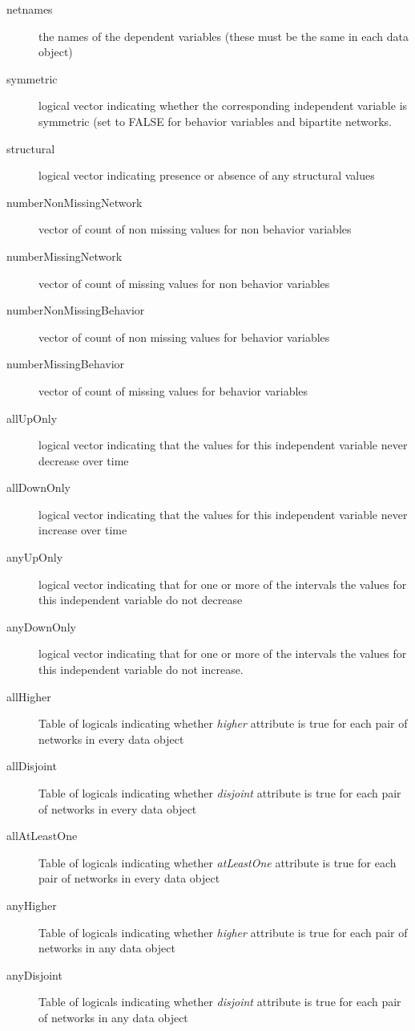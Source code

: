\documentclass[12pt,a4paper]{article}
\renewcommand{\=}{\,=\,}
\newcommand{\+}{\,+\,}
\begin{document}
\begin{description}
\item[netnames] the names of the dependent variables (these must be the same in
  each data object)
\item[symmetric] logical vector indicating whether the corresponding independent
  variable is symmetric (set to FALSE for behavior variables and bipartite
  networks.
\item[structural] logical vector indicating presence or absence of any
  structural values
\item[numberNonMissingNetwork] vector of count of non missing values for non
  behavior variables
\item[numberMissingNetwork] vector of count of missing values for non
  behavior variables
\item[numberNonMissingBehavior] vector of count of non missing values for
  behavior variables
\item[numberMissingBehavior] vector of count of missing values for
  behavior variables
\item[allUpOnly] logical vector indicating that the values for this
  independent variable never decrease over time
\item[allDownOnly] logical vector indicating that the values for this
  independent variable never increase over time
\item[anyUpOnly] logical vector indicating that for one or more of the intervals
  the values for this independent variable do not decrease
\item[anyDownOnly] logical vector indicating that for one or more of the
  intervals the values for this independent variable do not increase.
\item[allHigher] Table of logicals indicating whether \emph{higher} attribute is
  true for each pair of networks in every data object
\item[allDisjoint] Table of logicals indicating whether \emph{disjoint}
  attribute is true for each pair of networks in every data object
\item[allAtLeastOne] Table of logicals indicating whether \emph{atLeastOne}
  attribute is true for each pair of networks in every data object
\item[anyHigher] Table of logicals indicating whether \emph{higher} attribute is
  true for each pair of networks in any data object
\item[anyDisjoint] Table of logicals indicating whether \emph{disjoint}
  attribute is true for each pair of networks in any data object

\end{description}
\end{document}
